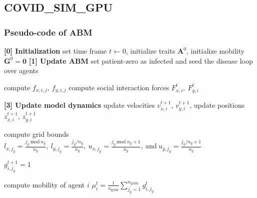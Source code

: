 \begin{frame}[t,label=abm_7]
\begin{columns}[t]
	\end{columns}
	\vspace{-3em}
\end{frame}
\addtocounter{footnote}{-2}
\subsection{COVID\_SIM\_GPU}
\begin{frame}
	\frametitle{Pseudo-code of ABM}
	\vspace{-1em}
	\begin{algorithm}[H] %
		\tiny
		\DontPrintSemicolon %
		\textbf{[0] Initialization}\;
		\qquad set time frame $t \gets 0$, initialize traits $\mathbf{A}^0$, initialize mobility $\mathbf{G}^0 = \mathbf{0}$\;
		\textbf{[1] Update ABM}\;
		\qquad {} {set patient-zero as infected and seed the disease}
		\qquad loop over agents  {
	
			\;
			\qquad {} {
				\qquad {} {
					compute $f_{x,i,j}, ~f_{y,i,j}$
				}
			}
			\qquad compute social interaction forces $F_{x,i}^{t}, ~F_{y,i}^{t}$\;
			
			\textbf{[3] Update model dynamics} update velocities $v_{x,i}^{t+1}$, $v_{y,i}^{t+1}$, update positions $z_{x,i}^{t+1}$, $z_{y,i}^{t+1}$\;
	
			\;
	
			\qquad {} {
				\qquad compute grid bounds $l_{x,j_g} = \frac{{j_g}~\text{mod}~n_{g}}{n_{g}},~ l_{y,j_g} = \frac{{j_g}/n_{g}}{n_{g}},~ u_{x,j_g} = \frac{{j_g}~\text{mod}~n_{g} + 1}{n_{g}},~\text{and}~ u_{y,j_g} = \frac{{j_g}/n_{g} + 1}{n_{g}}$
	
				\qquad {} {
					$g_{i,j_{g}}^{t+1} = 1$
				} \qquad {}
			}
			\qquad compute mobility of agent $i$ $\mu_{i}^{t} = \frac{1}{n_{\text{grids}}}\sum_{j_{g}=1}^{n_{\text{grids}}}g_{i,j_{g}}^{t}$
	
}
\end{algorithm}
\end{frame}
